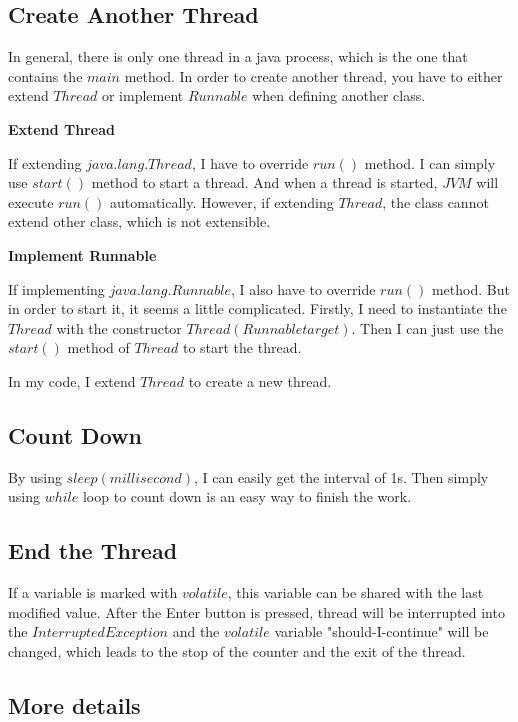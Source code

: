 \documentclass{article}
\begin{document}
\subsection{Create Another Thread}
In general, there is only one thread in a java process, which is the one that contains the $main$ method. In order to create another thread, you have to either extend $Thread$ or implement $Runnable$ when defining another class.
\begin{compactitem}
\item \textbf{Extend Thread}

If extending $java.lang.Thread$, I have to override $run()$ method. I can simply use $start()$ method to start a thread. And when a thread is started, $JVM$ will execute $run()$ automatically. However, if extending $Thread$, the class cannot extend other class, which is not extensible.

\item \textbf{Implement Runnable}

If implementing $java.lang.Runnable$, I also have to override $run()$ method. But in order to start it, it seems a little complicated. Firstly, I need to instantiate the $Thread$ with the constructor $Thread(Runnable target)$. Then I can just use the $start()$ method of $Thread$ to start the thread.

\end{compactitem}

In my code, I extend $Thread$ to create a new thread.

\subsection{Count Down}

By using $sleep(millisecond)$, I can easily get the interval of 1s. Then simply using $while$ loop to count down is an easy way to finish the work.

\subsection{End the Thread}

If a variable is marked with $volatile$, this variable can be shared with the last modified value. After the Enter button is pressed, thread will be interrupted into the $InterruptedException$ and the $volatile$ variable "should-I-continue" will be changed, which leads to the stop of the counter and the exit of the thread.

\subsection{More details}
\end{document}
